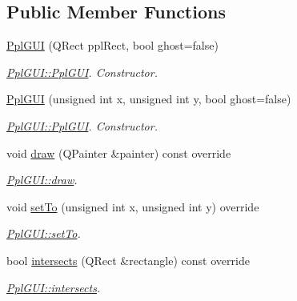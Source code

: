 \subsection*{Public Member Functions}
\begin{DoxyCompactItemize}
\item 
\hyperlink{classPplGUI_a575f17881dcc07898b3f61f5a1a48ac3}{Ppl\-G\-U\-I} (Q\-Rect ppl\-Rect, bool ghost=false)
\begin{DoxyCompactList}\small\item\em \hyperlink{classPplGUI_a575f17881dcc07898b3f61f5a1a48ac3}{Ppl\-G\-U\-I\-::\-Ppl\-G\-U\-I}. Constructor. \end{DoxyCompactList}\item 
\hyperlink{classPplGUI_ad03566a9fb76c98e1490372292fea344}{Ppl\-G\-U\-I} (unsigned int x, unsigned int y, bool ghost=false)
\begin{DoxyCompactList}\small\item\em \hyperlink{classPplGUI_a575f17881dcc07898b3f61f5a1a48ac3}{Ppl\-G\-U\-I\-::\-Ppl\-G\-U\-I}. Constructor. \end{DoxyCompactList}\item 
void \hyperlink{classPplGUI_a454ea7b7efa82f9bdd383cb70021c23b}{draw} (Q\-Painter \&painter) const override
\begin{DoxyCompactList}\small\item\em \hyperlink{classPplGUI_a454ea7b7efa82f9bdd383cb70021c23b}{Ppl\-G\-U\-I\-::draw}. \end{DoxyCompactList}\item 
void \hyperlink{classPplGUI_a9239f31269b63e32540c588736520e3c}{set\-To} (unsigned int x, unsigned int y) override
\begin{DoxyCompactList}\small\item\em \hyperlink{classPplGUI_a9239f31269b63e32540c588736520e3c}{Ppl\-G\-U\-I\-::set\-To}. \end{DoxyCompactList}\item 
bool \hyperlink{classPplGUI_aad8337d505325dcb8d16aa1ce31b76f9}{intersects} (Q\-Rect \&rectangle) const override
\begin{DoxyCompactList}\small\item\em \hyperlink{classPplGUI_aad8337d505325dcb8d16aa1ce31b76f9}{Ppl\-G\-U\-I\-::intersects}. \end{DoxyCompactList}\end{DoxyCompactItemize}
